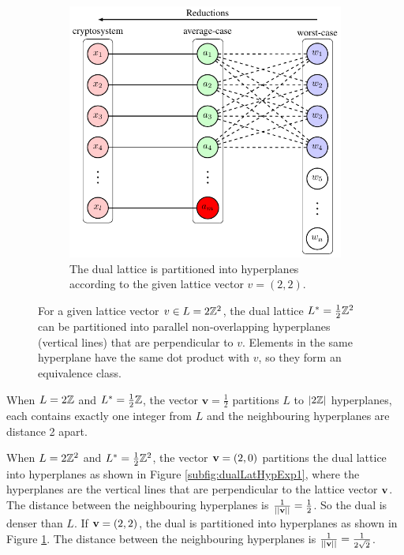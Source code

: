 \documentclass[../main.tex]{subfiles}
\begin{document}
\begin{figure}[hbt!]
	\begin{subfigure}[b]{0.95\textwidth}
		\centering
		\includegraphics[page=6]{images/Lattice_crypto_tikz_folder.pdf}
		\caption{The dual lattice is partitioned into hyperplanes according to the given lattice vector $v=(2,2)$.}
		\label{subfig:dualLatHypExp2}
	\end{subfigure}
	\caption{For a given lattice vector $v \in L=2\mathbb{Z}^2$, the dual lattice $L^*=\frac{1}{2}\mathbb{Z}^2$ can be partitioned into parallel non-overlapping hyperplanes (vertical lines) that are perpendicular to $v$. Elements in the same hyperplane have the same dot product with $v$, so they form an equivalence class.}
	\label{fig:dualLatHyp}
\end{figure}


\begin{example}
When $L = 2\mathbb{Z}$ and $L^*= \frac{1}{2}\mathbb{Z}$, the vector $\mathbf{v}=\frac{1}{2}$ partitions $L$ to $|2\mathbb{Z}|$ hyperplanes, each contains exactly one integer from $L$ and the neighbouring hyperplanes are distance 2 apart. 

When $L=2\mathbb{Z}^2$ and $L^*=\frac{1}{2}\mathbb{Z}^2$, the vector $\mathbf{v}=(2,0)$ partitions the dual lattice into hyperplanes as shown in Figure \ref{subfig:dualLatHypExp1}, where the hyperplanes are the vertical lines that are perpendicular to the lattice vector $\mathbf{v}$. The distance between the neighbouring hyperplanes is $\frac{1}{||\mathbf{v}||} = \frac{1}{2}$. So the dual is denser than $L$. 
If $\mathbf{v}=(2,2)$, the dual is partitioned into hyperplanes as shown in Figure \ref{subfig:dualLatHypExp2}. The distance between the neighbouring hyperplanes is $\frac{1}{||\mathbf{v}||}=\frac{1}{2\sqrt{2}}$.
\end{example}
\end{document}

